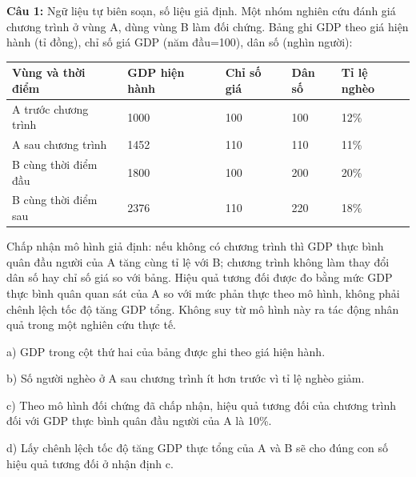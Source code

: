 \documentclass[12pt,a4paper]{article}
\begin{document}
\par\noindent\begin{minipage}{\linewidth}
\noindent\textbf{Câu 1:} Ngữ liệu tự biên soạn, số liệu giả định. Một nhóm nghiên cứu đánh giá chương trình ở vùng A, dùng vùng B làm đối chứng. Bảng ghi GDP theo giá hiện hành (tỉ đồng), chỉ số giá GDP (năm đầu=100), dân số (nghìn người):\par
\begin{center}\small\begin{tabularx}{\linewidth}{|X|X|X|X|X|}
\hline
Vùng và thời điểm & GDP hiện hành & Chỉ số giá & Dân số & Tỉ lệ nghèo \\ \hline
A trước chương trình & 1000 & 100 & 100 & 12\% \\ \hline
A sau chương trình & 1452 & 110 & 110 & 11\% \\ \hline
B cùng thời điểm đầu & 1800 & 100 & 200 & 20\% \\ \hline
B cùng thời điểm sau & 2376 & 110 & 220 & 18\% \\ \hline
\end{tabularx}\end{center}
Chấp nhận mô hình giả định: nếu không có chương trình thì GDP thực bình quân đầu người của A tăng cùng tỉ lệ với B; chương trình không làm thay đổi dân số hay chỉ số giá so với bảng. Hiệu quả tương đối được đo bằng mức GDP thực bình quân quan sát của A so với mức phản thực theo mô hình, không phải chênh lệch tốc độ tăng GDP tổng. Không suy từ mô hình này ra tác động nhân quả trong một nghiên cứu thực tế.\par
\noindent a) GDP trong cột thứ hai của bảng được ghi theo giá hiện hành.\par
\noindent b) Số người nghèo ở A sau chương trình ít hơn trước vì tỉ lệ nghèo giảm.\par
\noindent c) Theo mô hình đối chứng đã chấp nhận, hiệu quả tương đối của chương trình đối với GDP thực bình quân đầu người của A là 10\%.\par
\noindent d) Lấy chênh lệch tốc độ tăng GDP thực tổng của A và B sẽ cho đúng con số hiệu quả tương đối ở nhận định c.\par
\end{minipage}\par\vspace{0.12cm}
\end{document}
